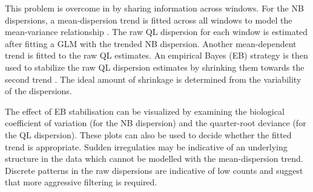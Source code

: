 \documentclass{report}\usepackage[]{graphicx}\usepackage[usenames,dvipsnames]{color}
\newcommand{\hlnum}[1]{\textcolor[rgb]{0.816,0.125,0.439}{#1}}%
\newcommand{\hlopt}[1]{\textcolor[rgb]{0,0,0}{#1}}%
\newcommand{\hlstd}[1]{\textcolor[rgb]{0.251,0.251,0.251}{#1}}%
\newcommand{\hlkwb}[1]{\textcolor[rgb]{0,0,0}{#1}}%
\newcommand{\hlkwc}[1]{\textcolor[rgb]{0.251,0.251,0.251}{#1}}%
\newcommand{\hlkwd}[1]{\textcolor[rgb]{0.878,0.439,0.125}{#1}}%
\newenvironment{knitrout}{}{} %
\begin{document}

This problem is overcome in  by sharing information across windows. 
For the NB dispersions, a mean-dispersion trend is fitted across all windows to model the mean-variance relationship \cite{mccarthy2012}. 
The raw QL dispersion for each window is estimated after fitting a GLM with the trended NB dispersion. 
Another mean-dependent trend is fitted to the raw QL estimates.  
An empirical Bayes (EB) strategy is then used to stabilize the raw QL dispersion estimates by shrinking them towards the second trend \cite{lund2012}. 
The ideal amount of shrinkage is determined from the variability of the dispersions.

\begin{knitrout}
\color{fgcolor}
\end{knitrout}

The effect of EB stabilisation can be visualized by examining the biological coefficient of variation (for the NB dispersion) and the quarter-root deviance (for the QL dispersion). 
These plots can also be used to decide whether the fitted trend is appropriate. 
Sudden irregulaties may be indicative of an underlying structure in the data which cannot be modelled with the mean-dispersion trend. 
Discrete patterns in the raw dispersions are indicative of low counts and suggest that more aggressive filtering is required.
\end{document}
